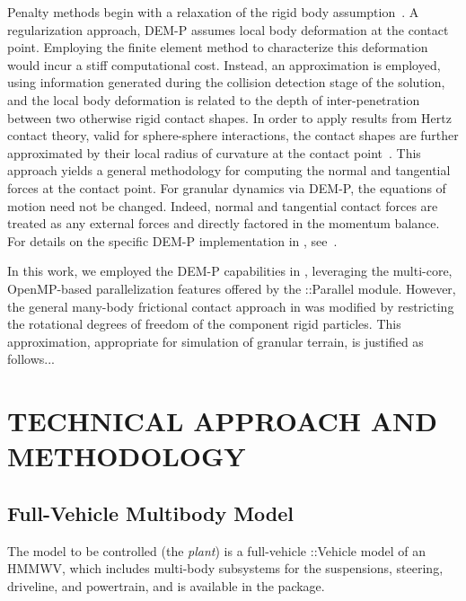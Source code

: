 \documentclass[12pt,twocolumn]{article}
\newcommand{\CHRONO}{{\sffamily{{Chrono}}}}
\newcommand{\ChronoVehicle}{{\sffamily{Chrono}}::Vehicle}
\newcommand{\ChronoParallel}{{\sffamily{Chrono}}::Parallel}
\begin{document}
Penalty methods begin with a relaxation of the rigid body assumption~\cite{cundall71}. A regularization approach, DEM-P assumes local body deformation at the contact point. Employing the finite element method to characterize this deformation would incur a stiff computational cost. Instead, an approximation is employed, using information generated during the collision detection stage of the solution, and the local body deformation is related to the depth of inter-penetration between two otherwise rigid contact shapes. In order to apply results from Hertz contact theory, valid for sphere-sphere interactions, the contact shapes are further approximated by their local radius of curvature at the contact point~\cite{johnson1987contact}.
%
This approach yields a general methodology for computing the normal and tangential forces at the contact point.   For granular dynamics via DEM-P, the equations of motion need not be changed. Indeed, normal and tangential contact forces are treated as any external forces and directly factored in the momentum balance.
%
For details on the specific DEM-P implementation in {\CHRONO}, see~\cite{fleischmannetalJCND2015}.

In this work, we employed the DEM-P capabilities in {\CHRONO}, leveraging the multi-core, OpenMP-based parallelization features offered by the {\ChronoParallel} module.  However, the general many-body frictional contact approach in {\CHRONO} was modified by restricting the rotational degrees of freedom of the component rigid particles.  This approximation, appropriate for simulation of granular terrain, is justified as follows...


\section{TECHNICAL APPROACH AND METHODOLOGY}\label{s:methodology}

\subsection{Full-Vehicle Multibody Model}\label{ss:FullVehicleModel}

The model to be controlled (the {\em plant}) is a full-vehicle {\ChronoVehicle} model of an HMMWV, which includes multi-body subsystems for the suspensions, steering, driveline, and powertrain, and is available in the {\CHRONO} package.
\end{document}
